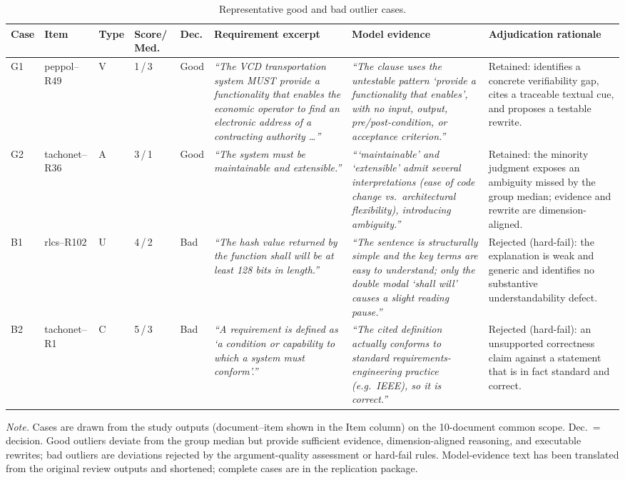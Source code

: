 \begin{table}[!t]
\centering
\caption{Representative good and bad outlier cases.}
\label{tab:representative_outlier_cases}
\scriptsize
\setlength{\tabcolsep}{3pt}
\renewcommand{\arraystretch}{1.25}
\begin{tabularx}{\textwidth}{p{0.7cm} p{1.6cm} p{0.9cm} p{1.0cm} p{0.95cm} X X X}
\toprule
\textbf{Case} & \textbf{Item} & \textbf{Type} & \textbf{Score/ Med.} & \textbf{Dec.} & \textbf{Requirement excerpt} & \textbf{Model evidence} & \textbf{Adjudication rationale} \\
\midrule
G1 & peppol--R49 & V & 1\,/\,3 & Good & \textit{``The VCD transportation system MUST provide a functionality that enables the economic operator to find an electronic address of a contracting authority \dots{}''} & \textit{``The clause uses the untestable pattern `provide a functionality that enables', with no input, output, pre/post-condition, or acceptance criterion.''} & Retained: identifies a concrete verifiability gap, cites a traceable textual cue, and proposes a testable rewrite. \\
\midrule
G2 & tachonet--R36 & A & 3\,/\,1 & Good & \textit{``The system must be maintainable and extensible.''} & \textit{```maintainable' and `extensible' admit several interpretations (ease of code change vs.\ architectural flexibility), introducing ambiguity.''} & Retained: the minority judgment exposes an ambiguity missed by the group median; evidence and rewrite are dimension-aligned. \\
\midrule
B1 & rlcs--R102 & U & 4\,/\,2 & Bad & \textit{``The hash value returned by the function shall will be at least 128 bits in length.''} & \textit{``The sentence is structurally simple and the key terms are easy to understand; only the double modal `shall will' causes a slight reading pause.''} & Rejected (hard-fail): the explanation is weak and generic and identifies no substantive understandability defect. \\
\midrule
B2 & tachonet--R1 & C & 5\,/\,3 & Bad & \textit{``A requirement is defined as `a condition or capability to which a system must conform'.''} & \textit{``The cited definition actually conforms to standard requirements-engineering practice (e.g.\ IEEE), so it is correct.''} & Rejected (hard-fail): an unsupported correctness claim against a statement that is in fact standard and correct. \\
\bottomrule
\end{tabularx}

\par\vspace{0.4em}
{\footnotesize \textit{Note.} Cases are drawn from the study outputs (document--item shown in the Item column) on the 10-document common scope. Dec.\ = decision. Good outliers deviate from the group median but provide sufficient evidence, dimension-aligned reasoning, and executable rewrites; bad outliers are deviations rejected by the argument-quality assessment or hard-fail rules. Model-evidence text has been translated from the original review outputs and shortened; complete cases are in the replication package.\par}
\end{table}
